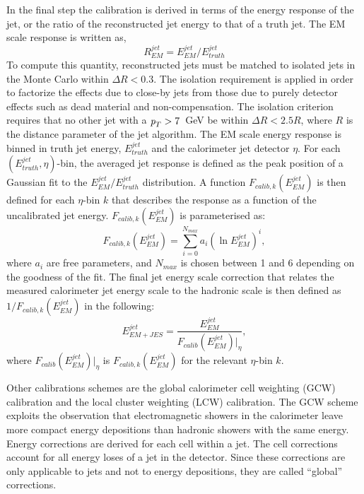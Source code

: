 \begin{itemize}
In the final step the calibration is derived in terms of the energy response of the jet, or the ratio of the reconstructed jet energy to that of a truth jet.  The EM scale response is written as,
%
\begin{equation}
R^{jet}_{EM} = E^{jet}_{EM} / E^{jet}_{truth}
\end{equation}
%
To compute this quantity, reconstructed jets must be matched to isolated jets in the Monte Carlo within $\Delta R < 0.3$. The isolation requirement is applied in order to factorize the effects due to close-by jets from those due to purely detector effects such as dead material and non-compensation. The isolation criterion requires that no other jet with a ${\emph{p}_{T}} > 7$~GeV be within $\Delta R < 2.5R$, where $R$ is the distance parameter of the jet algorithm. The EM scale energy response is binned in truth jet energy, $E^{jet}_{truth}$ and the calorimeter jet detector $\eta$.  For each $(E^{jet}_{truth}, \eta)$-bin, the averaged jet response is defined as the peak position of a Gaussian fit to the $E^{jet}_{EM} / E^{jet}_{truth}$ distribution.  A function $F_{calib,k}(E^{jet}_{EM})$ is then defined for each $\eta$-bin $k$ that describes the response as a function of the uncalibrated jet energy. $F_{calib,k}(E^{jet}_{EM})$ is parameterised as:
%
\begin{equation}
F_{calib,k}(E^{jet}_{EM}) = \sum_{i=0}^{N_{max}} a_i (\ln E^{jet}_{EM})^i,
\end{equation}
%
where $a_i$ are free parameters, and $N_{max}$ is chosen between 1 and 6 depending on the goodness of the fit. The final jet energy scale correction that relates the measured calorimeter jet energy scale to the hadronic scale is then defined as $1/F_{calib,k}(E^{jet}_{EM})$ in the following:
%
\begin{equation}
E^{jet}_{EM+JES} = \frac{E^{jet}_{EM}}{F_{calib}(E^{jet}_{EM})|_{\eta}},
\end{equation}
%
where $F_{calib}(E^{jet}_{EM})|_{\eta}$  is $F_{calib,k}(E^{jet}_{EM})$ for the relevant $\eta$-bin $k$.


Other calibrations schemes are the global calorimeter cell weighting (GCW) calibration and the local cluster weighting (LCW) calibration.  The GCW scheme exploits the observation that electromagnetic showers in the calorimeter leave more compact energy depositions than hadronic showers with the same energy.  Energy corrections are derived for each cell within a jet.  The cell corrections account for all energy loses of a jet in the detector. Since these corrections are only applicable to jets and not to energy depositions, they are called ``global'' corrections.


\end{itemize}
